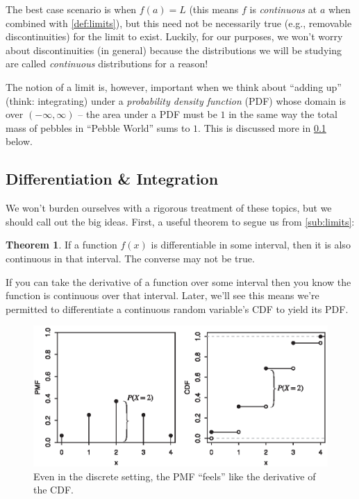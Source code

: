 \documentclass[12pt,english]{scrartcl}
\theoremstyle{definition}
\newtheorem{theorem}{Theorem}[section]
\theoremstyle{remark}
\begin{document}
The best case scenario is when $f(a) = L$ (this means $f$ is
\textit{continuous} at $a$ when combined with \cref{def:limits}), but this need not be
necessarily true (e.g., removable discontinuities) for the limit to exist.
Luckily, for our purposes, we won't worry about discontinuities (in general)
because the distributions we will be studying are called \textit{continuous}
distributions for a reason!

The notion of a limit is, however, important when we think about ``adding up''
(think: integrating) under a \textit{probability density function} (PDF) whose
domain is over $(-\infty, \infty)$ -- the area under a PDF must be $1$ in the
same way the total mass of pebbles in ``Pebble World'' sums to $1$. This is
discussed more in \cref{sub:differentiation_integration} below.

\subsection{Differentiation \& Integration}%
\label{sub:differentiation_integration}

We won't burden ourselves with a rigorous treatment of these topics, but we
should call out the big ideas. First, a useful theorem to segue us from
\cref{sub:limits}:

\begin{theorem}
    If a function $f(x)$ is differentiable in some interval, then it is
    also continuous in that interval. The converse may not be true.
\end{theorem}

If you can take the derivative of a function over some interval then you know
the function is continuous over that interval. Later, we'll see this means we're
permitted to differentiate a continuous random variable's CDF to yield its PDF.

\begin{figure}[ht]
    \centering
    \includegraphics[width=0.75\linewidth]{pmf_cdf}
    \caption{Even in the discrete setting, the PMF ``feels'' like the derivative of the CDF.}
    \label{fig:pmf_cdf}
\end{figure}
\end{document}
